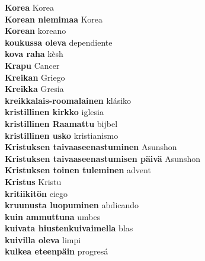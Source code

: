 \textbf{ Korea  } Korea \\
\textbf{ Korean niemimaa  } Korea \\
\textbf{ Korean  } koreano \\
\textbf{ koukussa oleva  } dependiente \\
\textbf{ kova raha  } kèsh \\
\textbf{ Krapu  } Cancer \\
\textbf{ Kreikan  } Griego \\
\textbf{ Kreikka  } Gresia \\
\textbf{ kreikkalais-roomalainen  } klásiko \\
\textbf{ kristillinen kirkko  } iglesia \\
\textbf{ kristillinen Raamattu  } bijbel \\
\textbf{ kristillinen usko  } kristianismo \\
\textbf{ Kristuksen taivaaseenastuminen  } Asunshon \\
\textbf{ Kristuksen taivaaseenastumisen päivä  } Asunshon \\
\textbf{ Kristuksen toinen tuleminen  } advent \\
\textbf{ Kristus  } Kristu \\
\textbf{ kritiikitön  } ciego \\
\textbf{ kruunusta luopuminen  } abdicando \\
\textbf{ kuin ammuttuna  } umbes \\
\textbf{ kuivata hiustenkuivaimella  } blas \\
\textbf{ kuivilla oleva  } limpi \\
\textbf{ kulkea eteenpäin  } progresá \\
